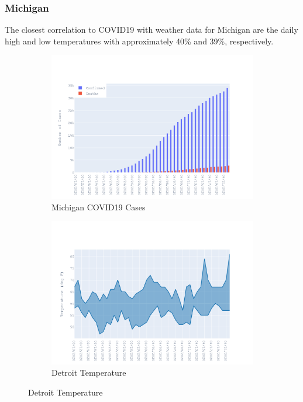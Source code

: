 \documentclass{homework}
\begin{document}
\newpage
\subsubsection{Michigan}

The closest correlation to COVID19 with weather data for Michigan are the daily high and low temperatures with approximately 40\% and 39\%, respectively.

\begin{figure}[H]
  \centering
  \begin{subfigure}{0.45\linewidth}
    \includegraphics[width=\linewidth]{task4/Michigan_cases.png}
    \caption{Michigan COVID19 Cases}
  \end{subfigure}
  \hfil
  \begin{subfigure}{0.45\linewidth}
    \includegraphics[width=\linewidth]{task4/Michigan_temp.png}
    \caption{Detroit Temperature}
  \end{subfigure}


\end{figure}
\end{document}
